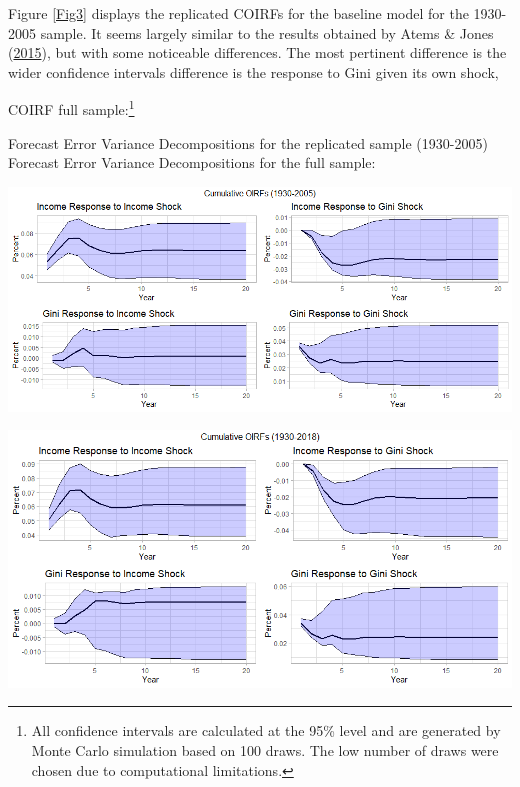 \documentclass[11pt,preprint, authoryear]{elsarticle}
\let\origfigure\figure
\let\endorigfigure\endfigure
\renewenvironment{figure}[1][2] {
    \expandafter\origfigure\expandafter[H]
} {
    \endorigfigure
}
\numberwithin{equation}{section}
\numberwithin{figure}{section}
\numberwithin{table}{section}
\let\rmarkdownfootnote\footnote%
\def\footnote{\protect\rmarkdownfootnote}
\begin{document}
Figure \ref{Fig3} displays the replicated COIRFs for the baseline model
for the 1930-2005 sample. It seems largely similar to the results
obtained by Atems \& Jones (\protect\hyperlink{ref-atems}{2015}), but
with some noticeable differences. The most pertinent difference is the
wider confidence intervals difference is the response to Gini given its
own shock,

COIRF full sample:\footnote{All confidence intervals are calculated at
  the 95\% level and are generated by Monte Carlo simulation based on
  100 draws. The low number of draws were chosen due to computational
  limitations.}

Forecast Error Variance Decompositions for the replicated sample
(1930-2005) Forecast Error Variance Decompositions for the full sample:

\newpage

\begin{figure}[H]
\includegraphics[width=1\linewidth]{images/Fig3_rep_COIRFs} \caption{\label{Fig3}}\label{fig:Fig3}
\end{figure}

\begin{figure}[H]
\includegraphics[width=1\linewidth]{images/Fig4_baseline_full_COIRFs} \caption{\label{Fig4}}\label{fig:Fig4}
\end{figure}
\end{document}
